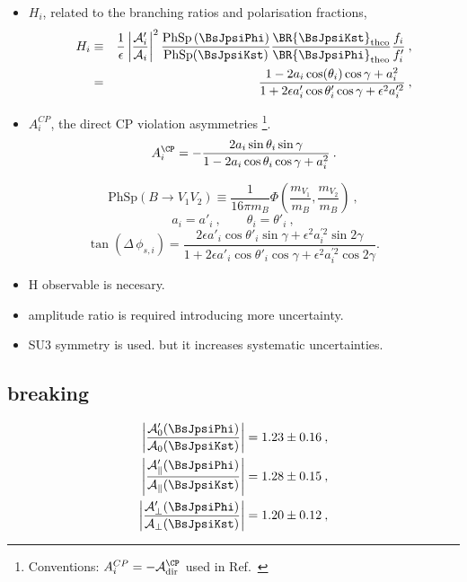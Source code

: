 \begin{itemize}
\item $H_i$, related to the branching ratios and polarisation fractions,
\begin{eqnarray}\label{Eq:Hobs_Vector}
H_i & \equiv &  \frac{1}{\epsilon} \left|\frac{\mathcal{A}'_i}{\mathcal{A}_i}\right|^2
\frac{\text{PhSp}\left(\BsJpsiPhi\right)}{\text{PhSp}(\BsJpsiKst)}
\frac{\BR{\BsJpsiKst}_{\text{theo}}}{\BR{\BsJpsiPhi}_{\text{theo}}}
\frac{f_i}{f'_i}\:,  \\
  & = & \frac{1-2a_i \cos(\theta_i) \cos\gamma+a_i^{2}}{1+2\epsilon a'_i \cos\theta'_i\cos\gamma +\epsilon^2 a_i^{\prime 2}} \:, \nonumber
\end{eqnarray}
\item $A^{CP}_i$, the direct CP violation asymmetries%
\footnote{Conventions: $A^{CP}_i = -\mathcal{A}_{\text{dir}}^{\CP}$ used in Ref.~\cite{DeBruyn:2014oga}}.
\begin{equation}\label{eq:ACPpeng}
A^{\CP}_i= -\frac{2a_i\sin\theta_i\sin\gamma}{1-2a_i\cos\theta_i\cos\gamma+a_i^{2}}\:.
\end{equation}
\end{itemize}
\begin{equation}
\text{PhSp}(B\to V_1V_2) \equiv \frac{1}{16\pi m_B}\Phi\left(\frac{m_{V_1}}{m_B}, \frac{m_{V_2}}{m_B}\right)\:,
\end{equation}
\begin{equation}\label{Eq:penguin_relation}
a_i = a'_i\:,\qquad \theta_i = \theta'_i\:,
\end{equation}
\begin{equation}\label{tandelta}
\tan(\Delta\,\phi_{s,i}) = \frac{2\epsilon a'_i \cos\theta'_i \sin\gamma+\epsilon^2 a^{\prime 2}_i \sin2\gamma}{1+2\epsilon a'_i \cos\theta'_i \cos\gamma+ \epsilon^2 a^{\prime 2}_i \cos2\gamma}.
\end{equation}


\begin{itemize}
  \item H observable is necesary.
  \item amplitude ratio is required introducing more uncertainty.
  \item SU3 symmetry is used. but it increases systematic uncertainties.
\end{itemize}

\subsection{\grpsuthree breaking}
\label{su3_breaking}

\begin{align}
\left|\frac{\mathcal{A}'_0(\BsJpsiPhi)}{\mathcal{A}_0(\BsJpsiKst)}\right| & = 1.23 \pm 0.16\:,\label{Eq:AmpRat_JpsiKstar_long}\\
\left|\frac{\mathcal{A}'_{\parallel}(\BsJpsiPhi)}{\mathcal{A}_{\parallel}(\BsJpsiKst)}\right| & = 1.28 \pm 0.15\:,\\
\left|\frac{\mathcal{A}'_{\perp}(\BsJpsiPhi)}{\mathcal{A}_{\perp}(\BsJpsiKst)}\right| & = 1.20 \pm 0.12\:,\label{Eq:AmpRat_JpsiKstar_perp}
\end{align}
